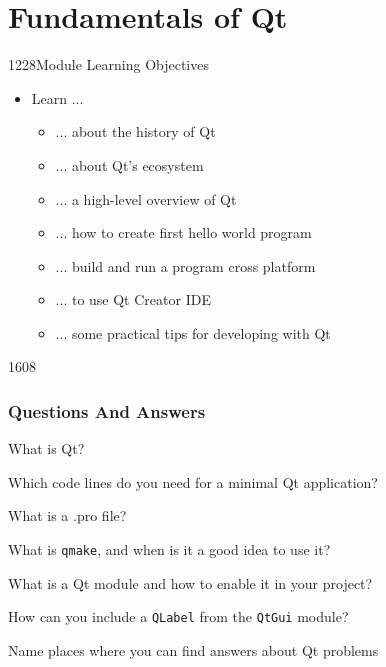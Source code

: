 \section{Fundamentals of Qt}

\begin{slide}{1228}{Module Learning Objectives}
  \label{fundamentals}
  \begin{itemize}
  \item Learn ...
    \begin{itemize}
    \item ... about the history of Qt
    \item ... about Qt's ecosystem
    \item ... a high-level overview of Qt
    \item ... how to create first hello world program
    \item ... build and run a program cross platform
    \item ... to use Qt Creator IDE
    \item ... some practical tips for developing with Qt
    \end{itemize}
  \end{itemize}
\end{slide}







\begin{slide}{1608}
  \frametitle{Questions And Answers}
  \begin{questionize}
  \item What is Qt?
  \item Which code lines do you need for a minimal Qt application?
  \item What is a .pro file?
  \item What is \texttt{qmake}, and when is it a good idea to use it?
  \item What is a Qt module and how to enable it in your project?
  \item How can you include a \texttt{QLabel} from the \texttt{QtGui} module?
  \item Name places where you can find answers about Qt problems
  \end{questionize}
\end{slide}



% 

